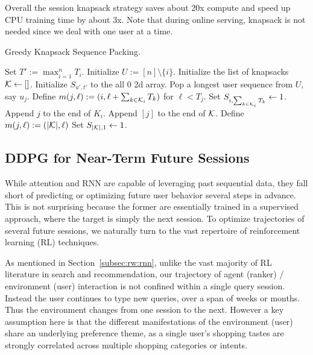 Overall the session knapsack strategy saves about 20x compute and speed up CPU training time by about 3x. Note that during online serving, knapsack is not needed since we deal with one user at a time.
\begin{algorithm}[t]
\caption{Greedy Knapsack Sequence Packing.}
\label{alg:greedy_knapsack}
\begin{algorithmic}[1]
\STATE Set $T' := \max_{i=1}^n T_i$.
\STATE Initialize $U := [n] \setminus \{i\}$.
\STATE Initialize the list of knapsacks $\mathcal{K} \leftarrow []$.
\STATE Initialize $S_{u', t'}$ to the all $0$ 2d array.
    \STATE Pop a longest user sequence from $U$, say $u_j$.
        \STATE Define $m(j, \ell) := (i, \ell + \sum_{k \in \mathcal{K}_i} T_k)$ for $\ell < T_j$.
        \STATE Set $S_{i, \sum_{k \in \mathcal{K}_i} T_k} \leftarrow 1$.
        \STATE Append $j$ to the end of $K_i$.
    \ELSE
        \STATE Append $[j]$ to the end of $\mathcal{K}$.
        \STATE Define $m(j, \ell) := (|\mathcal{K}|, \ell)$
        \STATE Set $S_{|\mathcal{K}|, 1} \leftarrow 1$.
    \ENDIF
\ENDWHILE

\end{algorithmic}
\end{algorithm}
\subsection{DDPG for Near-Term Future Sessions}
\label{sec:ddpg}

While attention and RNN are capable of leveraging past sequential data, they fall short of predicting or optimizing future user behavior several steps in advance. This is not surprising because the former are essentially trained in a supervised approach, where the target is simply the next session. To optimize trajectories of several future sessions, we naturally turn to the vast repertoire of reinforcement learning (RL) techniques. 

As mentioned in Section~\ref{subsec:rw:rnn}, unlike the vast majority of RL literature in search and recommendation, our trajectory of agent (ranker) / environment (user) interaction is not confined within a single query session. Instead the user continues to type new queries, over a span of weeks or months. Thus the environment changes from one session to the next. However a key assumption here is that the different manifestations of the environment (user) share an underlying preference theme, as a single user's shopping tastes are strongly correlated across multiple shopping categories or intents.

